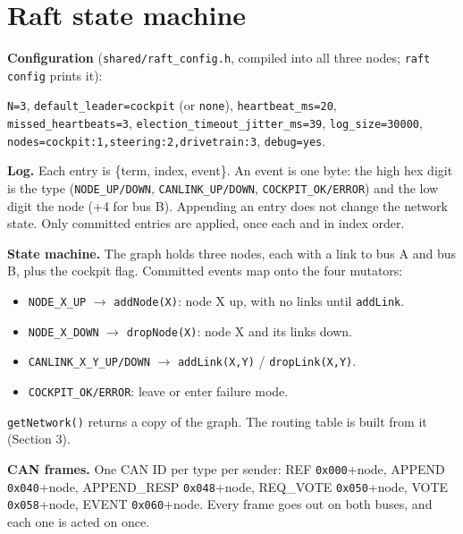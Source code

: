 \documentclass[10pt]{article}
\begin{document}
\newpage
\section{Raft state machine}

\textbf{Configuration} (\texttt{shared/raft\_config.h}, compiled into all three nodes; \texttt{raft config} prints it):
{\sloppy\texttt{N=3}, \texttt{default\_leader=cockpit} (or \texttt{none}), \texttt{heartbeat\_ms=20}, \texttt{missed\_heartbeats=3}, \texttt{election\_timeout\_jitter\_ms=39}, \texttt{log\_size=30000}, \texttt{nodes=cockpit:1,steering:2,drivetrain:3}, \texttt{debug=yes}.\par}

\textbf{Log.} Each entry is \{term, index, event\}. An event is one byte: the high hex digit is the type (\texttt{NODE\_UP/DOWN}, \texttt{CANLINK\_UP/DOWN}, \texttt{COCKPIT\_OK/ERROR}) and the low digit the node (+4 for bus B). Appending an entry does not change the network state. Only committed entries are applied, once each and in index order.

\textbf{State machine.} The graph holds three nodes, each with a link to bus A and bus B, plus the cockpit flag. Committed events map onto the four mutators:
\begin{itemize}
  \item \texttt{NODE\_X\_UP} $\to$ \texttt{addNode(X)}: node X up, with no links until \texttt{addLink}.
  \item \texttt{NODE\_X\_DOWN} $\to$ \texttt{dropNode(X)}: node X and its links down.
  \item \texttt{CANLINK\_X\_Y\_UP/DOWN} $\to$ \texttt{addLink(X,Y)} / \texttt{dropLink(X,Y)}.
  \item \texttt{COCKPIT\_OK/ERROR}: leave or enter failure mode.
\end{itemize}
\texttt{getNetwork()} returns a copy of the graph. The routing table is built from it (Section 3).

\textbf{CAN frames.} One CAN ID per type per sender: REF \texttt{0x000}+node, APPEND \texttt{0x040}+node, APPEND\_RESP \texttt{0x048}+node, REQ\_VOTE \texttt{0x050}+node, VOTE \texttt{0x058}+node, EVENT \texttt{0x060}+node. Every frame goes out on both buses, and each one is acted on once.
\end{document}
